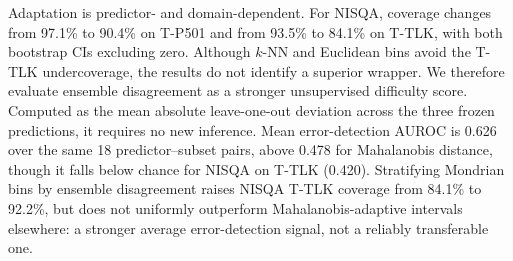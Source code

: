 

Adaptation is predictor- and domain-dependent. For NISQA, coverage changes from 97.1\% to 90.4\% on T-P501 and from 93.5\% to 84.1\% on T-TLK, with both bootstrap CIs excluding zero. Although $k$-NN and Euclidean bins avoid the T-TLK undercoverage, the results do not identify a superior wrapper. We therefore evaluate ensemble disagreement as a stronger unsupervised difficulty score. Computed as the mean absolute leave-one-out deviation across the three frozen predictions, it requires no new inference. Mean error-detection AUROC is 0.626 over the same 18 predictor--subset pairs, above 0.478 for Mahalanobis distance, though it falls below chance for NISQA on T-TLK (0.420). Stratifying Mondrian bins by ensemble disagreement raises NISQA T-TLK coverage from 84.1\% to 92.2\%, but does not uniformly outperform Mahalanobis-adaptive intervals elsewhere: a stronger average error-detection signal, not a reliably transferable one.
